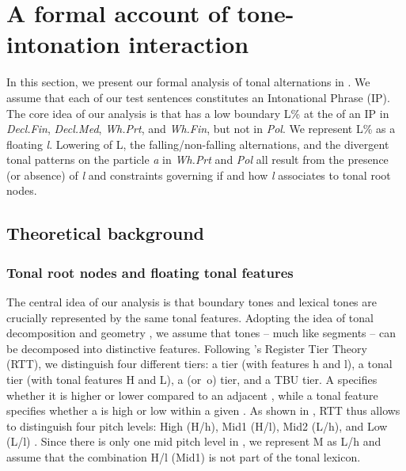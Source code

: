 \documentclass[output=paper,newtxmath,modfonts,nonflat,hidelinks]{langsci/langscibook}
\begin{document}
\section{A formal account of tone-intonation interaction}\label{sec:gjersoe:ouranalysis}

In this section, we present our formal analysis of tonal alternations in .
We assume that each of our test sentences constitutes an Intonational Phrase (IP).
The core idea of our analysis is that  has a low boundary  L\% at the  of an IP in \textit{Decl.Fin}, \textit{Decl.Med}, \textit{Wh.Prt}, and \textit{Wh.Fin}, but not in \textit{Pol}.
We represent L\% as a floating  \textit{l}.
Lowering of L, the falling/non-falling alternations, and the divergent tonal patterns on the particle \textit{a} in \textit{Wh.Prt} and \textit{Pol} all result from the presence (or absence) of \textit{l} and constraints governing if and how \textit{l} associates to tonal root nodes.

\subsection{Theoretical background}\label{sec:gjersoe:theorybackground}

\subsubsection{Tonal root nodes and floating tonal features}\label{sec:gjersoe:defective}

The central idea of our analysis is that boundary tones and lexical tones are crucially represented by the same tonal features.
Adopting the idea of tonal decomposition and geometry \citep{Clements.1983,Hyman.1986,Snider.1999,Yip.2002},
we assume that tones -- much like segments -- can be decomposed into distinctive features.
Following \cite{Snider.1999}'s Register Tier Theory (RTT), we distinguish four different tiers:
a  tier (with  features h and l), a tonal tier (with tonal features H and L), a  (or~o) tier, and a TBU tier.
A  specifies whether it is higher or lower compared to an adjacent , while a tonal feature specifies whether a  is high or low within a given . 
As shown in , RTT thus allows to distinguish four pitch levels: High (H/h), Mid1 (H/l), Mid2 (L/h), and Low (L/l) \citep[62]{Snider.1999}.
Since there is only one mid pitch level in , we represent M as L/h and assume that the combination H/l (Mid1) is not part of the tonal lexicon.
\end{document}
